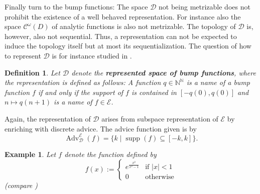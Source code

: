 \documentclass{eptcs-modified}
\newtheorem{definition}[theorem]{Definition}
\newtheorem{example}[theorem]{Example}
\newcommand{\adv}{\operatorname{Adv}}
\newcommand{\Baire}{{\mathbb{N}^\mathbb{N}}}
\newcommand{\demph}{\textbf}
\newcommand{\EE}{\mathcal E}
\newcommand{\TF}{\mathcal D}
\newcommand{\abs}[1]{\left|#1\right|}
\newcommand{\analytic}{\mathcal C^\omega(D)}
\newcommand{\supp}{\operatorname{supp}}
\begin{document}
			Finally turn to the bump functions:
			The space $\TF$ not being metrizable does not prohibit the existence of a well behaved representation.
			For instance also the space $\analytic$ of analytic functions is also not metrizable.
			The topology of $\TF$ is, however, also not sequential.
			Thus, a representation can not be expected to induce the topology itself but at most its sequentialization.
			The question of how to represent $\TF$ is for instance studied in \cite{zhong,MR2207129}.
			\begin{definition}\label{def:bump function representation}
				Let $\TF$ denote the \demph{represented space of bump functions}, where the representation is defined as follows: A function $q\in\Baire$ is a name of a bump function $f$ if and only if the support of $f$ is contained in $[-q(0),q(0)]$ and $n\mapsto q(n+1)$ is a name of $f\in\EE$.
			\end{definition}
			\noindent\begin{minipage}{.55\textwidth}
				Again, the representation of $\TF$ arises from subspace representation of $\EE$ by enriching with discrete advice.
				The advice function given is by
				\[ \adv^\EE_{\TF}(f) = \{k\mid \supp(f)\subseteq [-k,k]\}. \]
				\begin{example}\label{ex:a bump function}
					Let $f$ denote the function defined by
					\[ f(x) := \begin{cases} e^{\frac{x^2}{x^2-1}} &\text{if }\abs x < 1 \\ 0& \text{otherwise} \end{cases} \]
					(compare )
				\end{example}
			\end{minipage}
			\begin{minipage}{.4\textwidth}
				\label{fig:the bump function f}
			\end{minipage}
\end{document}
